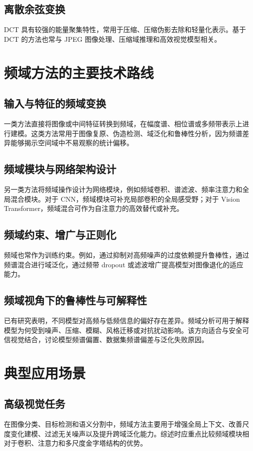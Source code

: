 \documentclass[journal,10pt]{IEEEtran}
\begin{document}
\subsection{离散余弦变换}
DCT 具有较强的能量聚集特性，常用于压缩、压缩伪影去除和轻量化表示。基于 DCT 的方法也常与 JPEG 图像处理、压缩域推理和高效视觉模型相关。

\section{频域方法的主要技术路线}
\subsection{输入与特征的频域变换}
一类方法直接将图像或中间特征转换到频域，在幅度谱、相位谱或多频带表示上进行建模。这类方法常用于图像复原、伪造检测、域泛化和鲁棒性分析，因为频谱差异能够揭示空间域中不易观察的统计偏移。

\subsection{频域模块与网络架构设计}
另一类方法将频域操作设计为网络模块，例如频域卷积、谱滤波、频率注意力和全局混合模块。对于 CNN，频域模块可补充局部卷积的全局感受野；对于 Vision Transformer，频域混合可作为自注意力的高效替代或补充。

\subsection{频域约束、增广与正则化}
频域也常作为训练约束。例如，通过抑制对高频噪声的过度依赖提升鲁棒性，通过频谱混合进行域泛化，通过频带 dropout 或滤波增广提高模型对图像退化的适应能力。

\subsection{频域视角下的鲁棒性与可解释性}
已有研究表明，不同模型对高频与低频信息的偏好存在差异。频域分析可用于解释模型为何受到噪声、压缩、模糊、风格迁移或对抗扰动影响。该方向适合与安全可信视觉结合，讨论模型频谱偏置、数据集频谱偏差与泛化失败原因。

\section{典型应用场景}
\subsection{高级视觉任务}
在图像分类、目标检测和语义分割中，频域方法主要用于增强全局上下文、改善尺度变化建模、过滤无关噪声以及提升跨域泛化能力。综述时应重点比较频域模块相对于卷积、注意力和多尺度金字塔结构的优势。
\end{document}
